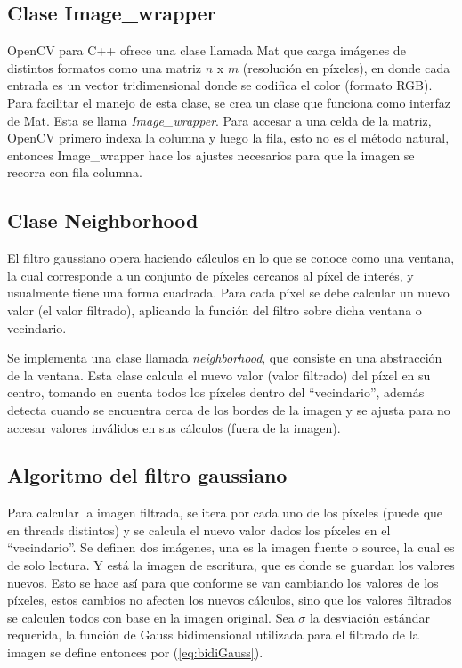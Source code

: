 \documentclass {article}
\begin{document}
\subsection{Clase Image\_wrapper}
OpenCV para C++ ofrece una clase llamada Mat que carga imágenes de distintos formatos como una
matriz $n$ x $m$ (resolución en píxeles), en donde cada entrada es un vector tridimensional donde se
codifica el color (formato RGB). Para facilitar el manejo de esta clase, se crea un clase que
funciona como interfaz de Mat. Esta se llama \textit{Image\_wrapper}. Para accesar a una celda de la
matriz, OpenCV primero indexa la columna y luego la fila, esto no es el método natural, entonces
Image\_wrapper hace los ajustes necesarios para que la imagen se recorra con fila columna.


\subsection{Clase Neighborhood}
El filtro gaussiano opera haciendo cálculos en lo que se conoce como una ventana, la cual
corresponde a un conjunto de píxeles cercanos al píxel de interés, y usualmente tiene una forma
cuadrada. Para cada píxel se debe calcular un nuevo valor (el valor filtrado), aplicando la función
del filtro sobre dicha ventana o vecindario.

Se implementa una clase llamada \textit{neighborhood}, que consiste en una abstracción de la
ventana. Esta clase calcula el nuevo valor (valor filtrado) del píxel en su centro, tomando en
cuenta todos los píxeles dentro del ``vecindario'', además detecta cuando se encuentra cerca de los
bordes de la imagen y se ajusta para no accesar valores inválidos en sus cálculos (fuera de la
imagen).

\subsection{Algoritmo del filtro gaussiano}

Para calcular la imagen filtrada, se itera por cada uno de los píxeles (puede que en threads
distintos) y se calcula el nuevo valor dados los píxeles en el ``vecindario''. Se definen dos
imágenes, una es la imagen fuente o source, la cual es de solo lectura. Y está la imagen de
escritura, que es donde se guardan los valores nuevos. Esto se hace así para que conforme se van
cambiando los valores de los píxeles, estos cambios no afecten los nuevos cálculos, sino que los
valores filtrados se calculen todos con base en la imagen original. Sea $\sigma$ la desviación
estándar requerida, la función de Gauss bidimensional utilizada para el filtrado de la imagen se
define entonces por (\ref{eq:bidiGauss}).
\end{document}
